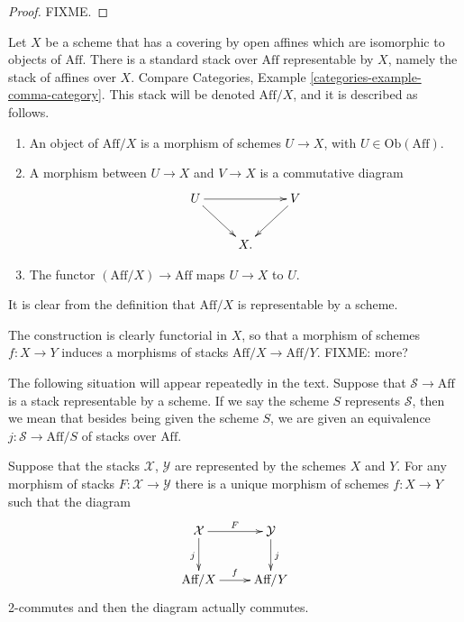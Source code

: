 \begin{proof}
FIXME.
\end{proof}

\begin{example}
\label{example-standard-representable-scheme}
Let $X$ be a scheme that has a covering by open affines which are isomorphic
to objects of $\text{Aff}$. There is a standard stack over $\text{Aff}$
representable by $X$, namely the stack of affines over $X$. Compare
Categories, Example \ref {categories-example-comma-category}.
This stack will be denoted $\text{Aff}/X$, and it is described as follows.
\begin{enumerate}
\item An object of $\text{Aff}/X$ is a morphism of schemes
$U \to X$, with $U \in \text{Ob}(\text{Aff})$.
\item A morphism between $U\to X$ and $V \to X$ is a commutative diagram
$$
\xymatrix{
U \ar[rr] \ar[rd] && V \ar[ld] \\
&X.&}
$$
\item The functor $(\text{Aff}/X) \to \text{Aff}$ maps $U\to X$ to $U$.
\end{enumerate}
It is clear from the definition that $\text{Aff}/X$ is representable by
a scheme. 

\medskip\noindent
The construction is clearly functorial in $X$, so that a morphism
of schemes $f : X \to Y$ induces a morphisms of stacks 
$\text{Aff}/X \to \text{Aff}/Y$. FIXME: more?
\end{example}

\begin{situation}
\label{situation-stack-represented-by-scheme}
The following situation will appear repeatedly in the text. Suppose that
$\mathcal{S} \to \text{Aff}$ is a stack representable by a scheme. If we
say the scheme $S$ represents $\mathcal{S}$, then we mean that besides 
being given the scheme $S$, we are given an equivalence $j : \mathcal{S}
\to \text{Aff}/S$ of stacks over $\text{Aff}$.
\end{situation}

\begin{lemma}
\label{lemma-morphism-stacks-representable-by-schemes}
Suppose that the stacks $\mathcal{X}$, $\mathcal{Y}$ are represented
by the schemes $X$ and $Y$. For any morphism of stacks $F : \mathcal{X}
\to \mathcal{Y}$ there is a unique morphism of schemes $f : X \to Y$
such that the diagram
$$
\xymatrix{
\mathcal{X} \ar[r]^F \ar[d]_j & \mathcal{Y} \ar[d]^j \\
\text{Aff}/X \ar[r]^f & \text{Aff}/Y}
$$
2-commutes and then the diagram actually commutes.
\end{lemma}

